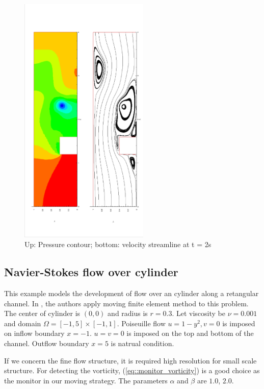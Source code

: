 \documentclass[a4paper, 11pt]{article}
\begin{document}
      \begin{figure}[!htbp]
        \centering
        \includegraphics[width = 0.55\textwidth, angle = -90]{picture/step_flow_data/contour_streamline_t_2s.eps}
        \caption{\small Up: Pressure contour; bottom: velocity streamline
          at t = 2s}
        \label{fig::step_flow_contour_streamline_2s}
      \end{figure}

   \subsection{Navier-Stokes flow over cylinder}
   
      This example models the development of flow over an cylinder
      along a retangular channel. In \cite{cao1999anr}, the authors
      apply moving finite element method to this problem. The center
      of cylinder is $(0, 0)$ and radius is $r = 0.3$. Let viscosity
      be $\nu = 0.001$ and domain $\Omega = [-1, 5] \times [-1, 1]$. 
      Poiseuille flow $u = 1 - y^2, v = 0$ is imposed on inflow
      boundary $x = -1$. $u = v = 0$ is imposed on the top and bottom
      of the channel. Outflow boundary $x = 5$ is natrual
      condition. 

      If we concern the fine flow structure, it is required
      high resolution for small scale structure. For detecting the
      vorticity, (\ref{eq::monitor_vorticity}) is a good choice as the
      monitor in our moving strategy. The parameters $\alpha$ and
      $\beta$ are $1.0$, $2.0$. 
\end{document}
